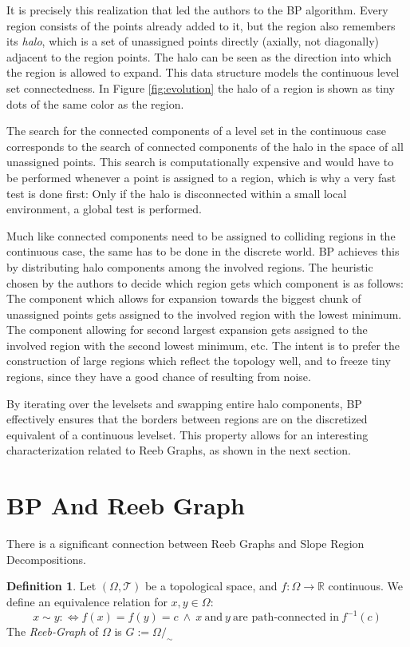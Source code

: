 \documentclass[a4paper,12pt,notitlepage,fullpage]{paper}
\theoremstyle{plain}
\theoremstyle{definition}
\newtheorem{defn}[thm]{Definition} %
\begin{document}
It is precisely this realization that led the authors to the BP algorithm. Every region consists of the points already added to it, but the region also remembers its \emph{halo}, which is a set of unassigned points directly (axially, not diagonally) adjacent to the region points. The halo can be seen as the direction into which the region is allowed to expand. This data structure models the continuous level set connectedness. In Figure \ref{fig:evolution} the halo of a region is shown as tiny dots of the same color as the region.

The search for the connected components of a level set in the continuous case corresponds to the search of connected components of the halo in the space of all unassigned points. This search is computationally expensive and would have to be performed whenever a point is assigned to a region, which is why a very fast test is done first: Only if the halo is disconnected within a small local environment, a global test is performed.

Much like connected components need to be assigned to colliding regions in the continuous case, the same has to be done in the discrete world. BP achieves this by distributing halo components among the involved regions. The heuristic chosen by the authors to decide which region gets which component is as follows: The component which allows for expansion towards the biggest chunk of unassigned points gets assigned to the involved region with the lowest minimum. The component allowing for second largest expansion gets assigned to the involved region with the second lowest minimum, etc. The intent is to prefer the construction of large regions which reflect the topology well, and to freeze tiny regions, since they have a good chance of resulting from noise.


By iterating over the levelsets and swapping entire halo components, BP effectively ensures that the borders between regions are on the discretized equivalent of a continuous levelset. This property allows for an interesting characterization related to Reeb Graphs, as shown in the next section.

\section{BP And Reeb Graph}

There is a significant connection between Reeb Graphs and Slope Region Decompositions.

\begin{defn}
Let $(\Omega, \mathcal T)$ be a topological space, and $f: \Omega \to \mathbb R$ continuous. We define an equivalence relation for $x,y \in \Omega$: 
\begin{equation*}
x \sim y :\Leftrightarrow f(x) = f(y) = c ~\land ~ x ~\text{and}~ y ~\text{are path-connected in}~ f^{-1}(c)
\end{equation*}
The \emph{Reeb-Graph} of $\Omega$ is $G := \Omega/_\sim$
\end{defn}
\end{document}

